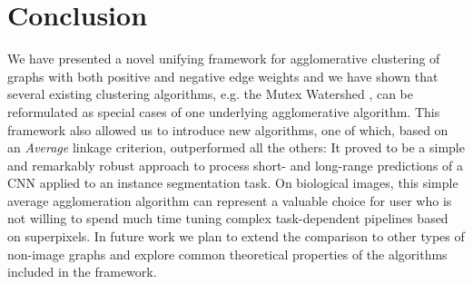 \section{Conclusion}
We have presented a novel unifying framework for agglomerative clustering of graphs with both positive and negative edge weights and we have shown that several existing clustering algorithms, e.g. the Mutex Watershed \cite{wolf2018mutex}, can be reformulated as special cases of one underlying agglomerative algorithm. This framework also allowed us to introduce new algorithms, one of which, based on an \emph{Average} linkage criterion, outperformed all the others: It proved to be a simple and remarkably robust approach to process short- and long-range predictions of a CNN applied to an instance segmentation task.
On biological images, this simple average agglomeration algorithm can represent a valuable choice for user who is not willing to spend much time tuning complex task-dependent pipelines based on superpixels.  
In future work we plan to extend the comparison to other types of non-image graphs and explore common theoretical properties of the algorithms included in the framework.

